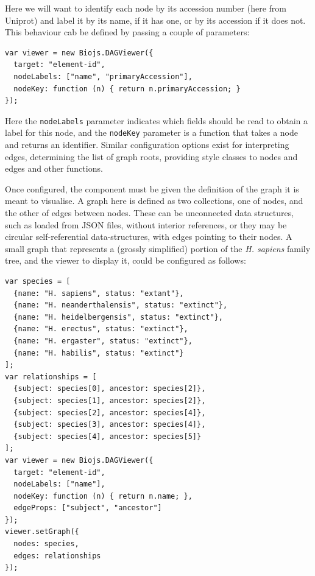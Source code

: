 \documentclass[10pt,a4paper,twocolumn]{article}
\begin{document}
Here we will want to identify each node by its accession number (here from Uniprot) and label
it by its name, if it has one, or by its accession if it does not. This behaviour
cab be defined by passing a couple of parameters:

\begin{lstlisting}[caption={Node Adaptor Example}, label={code:node-adaptor}]
var viewer = new Biojs.DAGViewer({
  target: "element-id",
  nodeLabels: ["name", "primaryAccession"],
  nodeKey: function (n) { return n.primaryAccession; }
});
\end{lstlisting}

Here the \texttt{nodeLabels} parameter indicates which fields should be read to
obtain a label for this node, and the \texttt{nodeKey} parameter is a function that
takes a node and returns an identifier. Similar configuration options exist for
interpreting edges, determining the list of graph roots, providing style classes to
nodes and edges and other functions.

Once configured, the component must be given the definition of the graph it
is meant to visualise. A graph here is defined as two collections, one of nodes,
and the other of edges between nodes. These can be unconnected data structures, such as
loaded from JSON files, without interior references, or they may be circular self-referential
data-structures, with edges pointing to their nodes. A small
graph that represents a (grossly simplified) portion of the \textit{H. sapiens} family tree,
and the viewer to display it, could be configured as follows:

\begin{lstlisting}[caption={\emph{H. sapiens} phylogenetic tree sample graph}]
var species = [
  {name: "H. sapiens", status: "extant"},
  {name: "H. neanderthalensis", status: "extinct"},
  {name: "H. heidelbergensis", status: "extinct"},
  {name: "H. erectus", status: "extinct"},
  {name: "H. ergaster", status: "extinct"},
  {name: "H. habilis", status: "extinct"}
];
var relationships = [
  {subject: species[0], ancestor: species[2]},
  {subject: species[1], ancestor: species[2]},
  {subject: species[2], ancestor: species[4]},
  {subject: species[3], ancestor: species[4]},
  {subject: species[4], ancestor: species[5]}
];
var viewer = new Biojs.DAGViewer({
  target: "element-id",
  nodeLabels: ["name"],
  nodeKey: function (n) { return n.name; },
  edgeProps: ["subject", "ancestor"]
});
viewer.setGraph({
  nodes: species,
  edges: relationships
});
\end{lstlisting}
\end{document}
